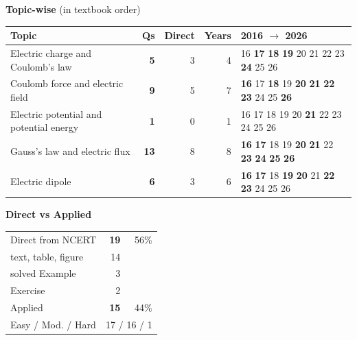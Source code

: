 {\small\textbf{\color{crimson}Topic-wise} (in textbook order)\par\smallskip
\begin{tabularx}{\linewidth}{@{}>{\raggedright\arraybackslash}Xrrrl@{}}\toprule
Topic & Qs & Direct & Years & 2016 $\rightarrow$ 2026\\\midrule
Electric charge and Coulomb's law & \textbf{5} & 3 & 4 & {\scriptsize {\color{gray!45}16} \textbf{17} \textbf{18} \textbf{19} {\color{gray!45}20} {\color{gray!45}21} {\color{gray!45}22} {\color{gray!45}23} \textbf{24} {\color{gray!45}25} {\color{gray!45}26}}\\
Coulomb force and electric field & \textbf{9} & 5 & 7 & {\scriptsize \textbf{16} {\color{gray!45}17} \textbf{18} {\color{gray!45}19} \textbf{20} \textbf{21} \textbf{22} \textbf{23} {\color{gray!45}24} {\color{gray!45}25} \textbf{26}}\\
Electric potential and potential energy & \textbf{1} & 0 & 1 & {\scriptsize {\color{gray!45}16} {\color{gray!45}17} {\color{gray!45}18} {\color{gray!45}19} {\color{gray!45}20} \textbf{21} {\color{gray!45}22} {\color{gray!45}23} {\color{gray!45}24} {\color{gray!45}25} {\color{gray!45}26}}\\
Gauss's law and electric flux & \textbf{13} & 8 & 8 & {\scriptsize \textbf{16} \textbf{17} {\color{gray!45}18} {\color{gray!45}19} \textbf{20} \textbf{21} {\color{gray!45}22} \textbf{23} \textbf{24} \textbf{25} \textbf{26}}\\
Electric dipole & \textbf{6} & 3 & 6 & {\scriptsize \textbf{16} \textbf{17} {\color{gray!45}18} \textbf{19} \textbf{20} {\color{gray!45}21} \textbf{22} \textbf{23} {\color{gray!45}24} {\color{gray!45}25} {\color{gray!45}26}}\\
\bottomrule\end{tabularx}}\par\medskip
\begin{minipage}[t]{0.34\linewidth}{\small\textbf{\color{crimson}Direct vs Applied}\par\smallskip
\begin{tabular}{@{}lrr@{}}\toprule
Direct from NCERT & \textbf{19} & 56\%\\
\quad text, table, figure & 14 &\\
\quad solved Example & 3 &\\
\quad Exercise & 2 &\\
Applied & \textbf{15} & 44\%\\\midrule
Easy / Mod. / Hard & \multicolumn{2}{r}{17 / 16 / 1}\\\bottomrule
\end{tabular}}\end{minipage}\hfill
